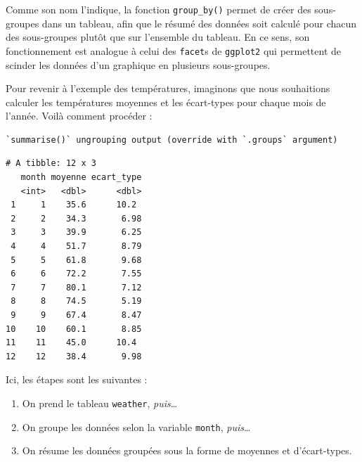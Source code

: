 \documentclass[
  a4paper,
]{article}
\newenvironment{Shaded}{\begin{snugshade}}{\end{snugshade}}
\newcommand{\DataTypeTok}[1]{\textcolor[rgb]{0.00,0.34,0.68}{#1}}
\newcommand{\KeywordTok}[1]{\textcolor[rgb]{0.12,0.11,0.11}{\textbf{#1}}}
\newcommand{\NormalTok}[1]{\textcolor[rgb]{0.12,0.11,0.11}{#1}}
\newcommand{\OperatorTok}[1]{\textcolor[rgb]{0.12,0.11,0.11}{#1}}
\newcommand{\OtherTok}[1]{\textcolor[rgb]{0.00,0.43,0.16}{#1}}
\newcommand{\StringTok}[1]{\textcolor[rgb]{0.75,0.01,0.01}{#1}}
\providecommand{\tightlist}{%
  \setlength{\itemsep}{0pt}\setlength{\parskip}{0pt}}
\begin{document}
Comme son nom l'indique, la fonction \texttt{group\_by()} permet de créer des sous-groupes dans un tableau, afin que le résumé des données soit calculé pour chacun des sous-groupes plutôt que sur l'ensemble du tableau. En ce sens, son fonctionnement est analogue à celui des \texttt{facet}s de \texttt{ggplot2} qui permettent de scinder les données d'un graphique en plusieurs sous-groupes.

Pour revenir à l'exemple des températures, imaginons que nous souhaitions calculer les températures moyennes et les écart-types pour chaque mois de l'année. Voilà comment procéder :

\begin{Shaded}
\end{Shaded}

\begin{verbatim}
`summarise()` ungrouping output (override with `.groups` argument)
\end{verbatim}

\begin{verbatim}
# A tibble: 12 x 3
   month moyenne ecart_type
   <int>   <dbl>      <dbl>
 1     1    35.6      10.2 
 2     2    34.3       6.98
 3     3    39.9       6.25
 4     4    51.7       8.79
 5     5    61.8       9.68
 6     6    72.2       7.55
 7     7    80.1       7.12
 8     8    74.5       5.19
 9     9    67.4       8.47
10    10    60.1       8.85
11    11    45.0      10.4 
12    12    38.4       9.98
\end{verbatim}

Ici, les étapes sont les suivantes :

\begin{enumerate}
\def\labelenumi{\arabic{enumi}.}
\tightlist
\item
  On prend le tableau \texttt{weather}, \emph{puis}\ldots{}
\item
  On groupe les données selon la variable \texttt{month}, \emph{puis}\ldots{}
\item
  On résume les données groupées sous la forme de moyennes et d'écart-types.
\end{enumerate}
\end{document}
